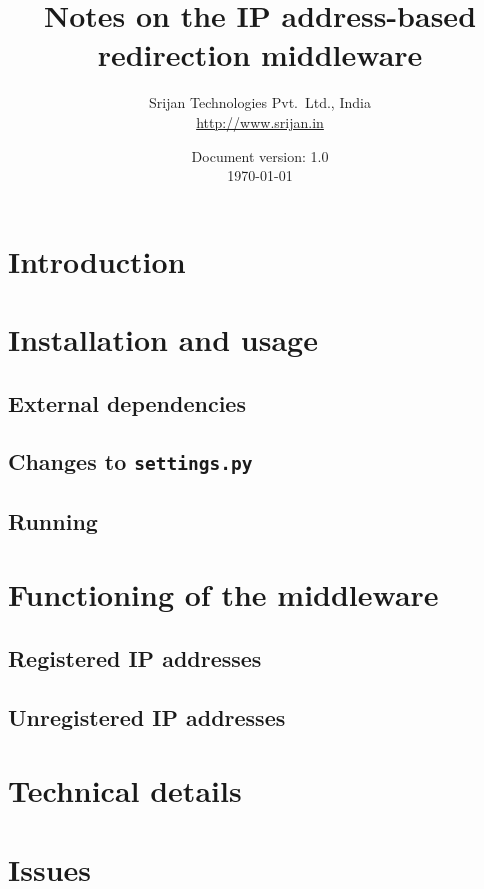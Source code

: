 \documentclass[a4paper]{report}
\newcommand{\revnum}{1.0\xspace}
\newcommand{\settings}{{\tt settings.py}\xspace}
\begin{document}
\begin{titlepage}
  \title{Notes on the IP address-based redirection middleware}
  \author{Srijan Technologies Pvt.~Ltd., India\\\url{http://www.srijan.in}}
  \date{Document version: \revnum\\ \today}
  \maketitle
\end{titlepage}

\setcounter{tocdepth}{2}
\tableofcontents

\setcounter{page}{1}

\chapter{Introduction}


\chapter{Installation and usage}

  \section{External dependencies}
  
  \section{Changes to \settings}
  
  \section{Running}

\chapter{Functioning of the middleware}

  \section{Registered IP addresses}
  \section{Unregistered IP addresses}

\chapter{Technical details}


\chapter{Issues}



\end{document}
